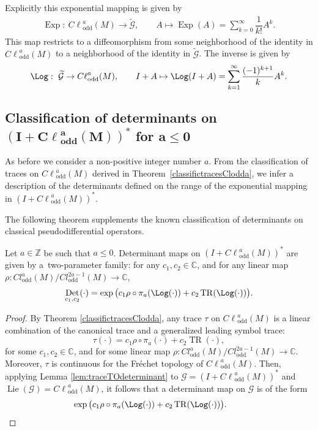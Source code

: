 \documentclass[pdftex]{sigma}
\DeclareMathOperator{\TR}{TR} \DeclareMathOperator{\Op}{Op}
\DeclareMathOperator{\odd}{odd} \DeclareMathOperator{\supp}{supp}
\DeclareMathOperator{\Lie}{Lie} \DeclareMathOperator{\Det}{Det}
\DeclareMathOperator{\Exp}{Exp} \DeclareMathOperator{\rk}{rk}
\newcommand{\C}{{\mathbb C}}
\newcommand{\Z}{{\mathbb Z}}
\def \Cl {{C\ell}}
\begin{document}
Explicitly this exponential mapping is given by
\begin{gather*}
\Exp: \ \Cl^{a}_{\odd}(M) \to\widetilde{\mathcal{G}},\qquad
A \mapsto\Exp(A)=\sum_{k=0}^\infty\dfrac{1}{k!}A^k.
\end{gather*}
This map restricts to a dif\/feomorphism from some neighborhood of the identity in $\Cl^{a}_{\odd}(M)$ to a neighborhood of the identity in $\widetilde{\mathcal{G}}$. The inverse is given by
\begin{gather*}
\Log: \ \widetilde{\mathcal{G}} \to \Cl^{a}_{\odd}(M),\qquad
I+A \mapsto\Log(I+A)=\sum_{k=1}^\infty\dfrac{(-1)^{k+1}}{k}A^k.
\end{gather*}

\subsection[Classification of determinants on $(I+\Cl^{a}_{\odd}(M))^*$ for $a\leq0$]{Classif\/ication of determinants on $\boldsymbol{(I+\Cl^{a}_{\odd}(M))^*}$ for $\boldsymbol{a\leq0}$}

As before we consider a non-positive integer number $a$. From the classif\/ication of traces on $\Cl^{a}_{\odd}(M)$ derived in Theorem~\ref{classifictracesClodda}, we infer a description of the determinants def\/ined on the range of the exponential mapping in $\left(I+\Cl^{a}_{\odd}(M)\right)^*$.

The following theorem supplements the known classif\/ication of determinants on classical pseudodif\/ferential operators.

\begin{theorem}\label{prop:ClassificationDetCl_{odd}^{0}(M)}
Let $a\in\Z$ be such that $a\leq0$. Determinant maps on $(I+\Cl^{a}_{\odd}(M))^*$ are given by a~two-parameter family: for any $c_1,c_2\!\in\!\C$, and for any linear map $\rho:Cl^{a}_{\odd}(M)/Cl^{2a-1}_{\odd}(M)\!\to\!\C$,
\[
\Det_{c_1,c_2}(\cdot)=\exp\big(c_1\rho\circ\pi_a(\Log(\cdot)) + c_2\TR(\Log(\cdot))\big).
\]
\end{theorem}

\begin{proof}
By Theorem \ref{classifictracesClodda}, any trace $\tau$ on $\Cl^{a}_{\odd}(M)$ is a linear combination of the canonical trace and a generalized leading symbol trace:
\[
\tau(\cdot)=c_1\rho\circ\pi_a(\cdot) + c_2\TR(\cdot),
\]
for some $c_1,c_2\in\C$, and for some linear map $\rho:Cl^{a}_{\odd}(M)/Cl^{2a-1}_{\odd}(M)\to\C$. Moreover, $\tau$ is continuous for the Fr\'echet topology of $\Cl^{a}_{\odd}(M)$. Then, applying Lemma \ref{lem:traceTOdeterminant} to ${\mathcal{G}}=\left(I+\Cl^{a}_{\odd}(M)\right)^*$ and $\Lie({\mathcal{G}})=\Cl^{a}_{\odd}(M)$, it follows that a determinant map on ${\mathcal{G}}$ is of the form
\begin{gather*}
\exp\big(c_1\rho\circ\pi_a(\Log(\cdot)) + c_2\TR(\Log(\cdot))\big).\tag*{\qed}
\end{gather*}
\renewcommand{\qed}{}
\end{proof}
\end{document}
